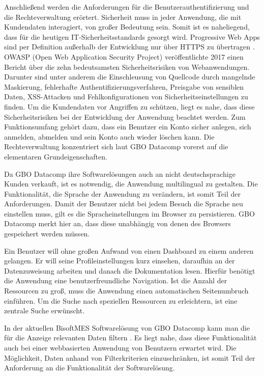 Anschließend werden die Anforderungen für die Benutzerauthentifizierung und die Rechteverwaltung erörtert.
Sicherheit muss in jeder Anwendung, die mit Kundendaten interagiert, von großer Bedeutung sein.
Somit ist es naheliegend, dass für die heutigen IT-Sicherheitsstandards gesorgt wird. Progressive
Web Apps sind per Definition außerhalb der Entwicklung nur über HTTPS zu übertragen \cite[S. 16]{KevinFrankPWAMasterarbeit}.
OWASP (Open Web Application Security Project) veröffentlichte 2017 einen Bericht über die zehn
bedeutsamsten Sicherheitsrisiken von Webanwendungen. Darunter sind unter anderem die Einschleusung
von Quellcode durch mangelnde Maskierung, fehlerhafte Authentifizierungsverfahren, Preisgabe von sensiblen Daten,
XSS-Attacken und Fehlkonfigurationen von Sicherheitseinstellungen zu finden.\cite[S. 4]{OWASPTopTen}
Um die Kundendaten vor Angriffen zu schützen, liegt es nahe, dass diese Sicherheitsrisiken bei der
Entwicklung der Anwendung beachtet werden. Zum Funktionsumfang gehört dazu,
dass ein Benutzer ein Konto sicher anlegen, sich anmelden, abmelden und sein Konto auch wieder
löschen kann. Die Rechteverwaltung konzentriert sich laut GBO Datacomp vorerst auf die elementaren
Grundeigenschaften.

Da GBO Datacomp ihre Softwarelösungen auch an nicht deutschsprachige Kunden verkauft, ist es notwendig,
die Anwendung multilingual zu gestalten. Die Funktionalität, die Sprache der Anwendung zu verändern,
ist somit Teil der Anforderungen. Damit der Benutzer nicht bei jedem Besuch die Sprache neu einstellen
muss, gilt es die Spracheinstellungen im Browser zu persistieren. GBO Datacomp merkt hier an, dass diese
unabhängig von denen des Browsers gespeichert werden müssen.

Ein Benutzer will ohne großen Aufwand von einen Dashboard zu einem anderen gelangen. Er will seine Profileinstellungen
kurz einsehen, daraufhin an der Datenzuweisung arbeiten und danach die Dokumentation lesen.
Hierfür benötigt die Anwendung eine benutzerfreundliche Navigation. Ist die Anzahl der Ressourcen zu 
groß, muss die Anwendung einen automatischen Seitenumbruch einführen. Um die Suche nach speziellen
Ressourcen zu erleichtern, ist eine zentrale Suche erwünscht.

In der aktuellen BisoftMES Softwarelösung von GBO Datacomp kann man die für die Anzeige relevanten Daten filtern \cite[S. 14]{BisoftMESHandbuch}.
Es liegt nahe, dass diese Funktionalität auch bei einer webbasierten Anwendung von Benutzern erwartet wird. Die Möglichkeit, Daten
anhand von Filterkriterien einzuschränken, ist somit Teil der Anforderung an die Funktionalität der Softwarelösung.


